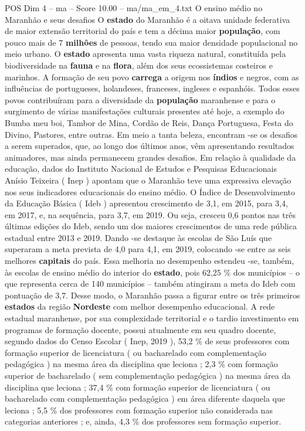 \begin{textsample}{POS Dim 4 – ma – Score 10.00 – ma/ma\_em\_4.txt}  \label{ex:f4_pos_060}
O ensino médio no Maranhão e seus desafios O \textbf{estado} do Maranhão é a oitava unidade federativa de maior extensão territorial do país e tem a décima maior \textbf{população}, com pouco mais de 7 \textbf{milhões} de pessoas, tendo sua maior densidade populacional no meio urbano.
O \textbf{estado} apresenta uma vasta riqueza natural, constituída pela biodiversidade na \textbf{fauna} e na \textbf{flora}, além dos seus ecossistemas costeiros e marinhos.
A formação de seu povo \textbf{carrega} a origem nos \textbf{índios} e negros, com as influências de portugueses, holandeses, franceses, ingleses e espanhóis.
Todos esses povos contribuíram para a diversidade da \textbf{população} maranhense e para o surgimento de várias manifestações culturais presentes até hoje, a exemplo do Bumba meu boi, Tambor de Mina, Cordão de Reis, Dança Portuguesa, Festa do Divino, Pastores, entre outras.
Em meio a tanta beleza, encontram -se os desafios a serem superados, que, ao longo dos últimos anos, vêm apresentando resultados animadores, mas ainda permanecem grandes desafios.
Em relação à qualidade da educação, dados do Instituto Nacional de Estudos e Pesquisas Educacionais Anísio Teixeira ( Inep ) apontam que o Maranhão teve uma expressiva elevação nos seus indicadores educacionais do ensino médio.
O Índice de Desenvolvimento da Educação Básica ( Ideb ) apresentou crescimento de 3,1, em 2015, para 3,4, em 2017, e, na sequência, para 3,7, em 2019.
Ou seja, cresceu 0,6 pontos nas três últimas edições do Ideb, sendo um dos maiores crescimentos de uma rede pública estadual entre 2013 e 2019.
Dando -se destaque às escolas de São Luís que superaram a meta prevista de 4,0 para 4,1, em 2019, colocando -se entre as seis melhores \textbf{capitais} do país.
Essa melhoria no desempenho estendeu -se, também, às escolas de ensino médio do interior do \textbf{estado}, pois 62,25 \% dos municípios – o que representa cerca de 140 municípios – também atingiram a meta do Ideb com pontuação de 3,7.
Desse modo, o Maranhão passa a figurar entre os três primeiros \textbf{estados} da região \textbf{Nordeste} com melhor desempenho educacional.
A rede estadual maranhense, por sua complexidade territorial e o tardio investimento em programas de formação docente, possui atualmente em seu quadro docente, segundo dados do Censo Escolar ( Inep, 2019 ), 53,2 \% de seus professores com formação superior de licenciatura ( ou bacharelado com complementação pedagógica ) na mesma área da disciplina que leciona ; 2,3 \% com formação superior de bacharelado ( sem complementação pedagógica ) na mesma área da disciplina que leciona ; 37,4 \% com formação superior de licenciatura ( ou bacharelado com complementação pedagógica ) em área diferente daquela que leciona ; 5,5 \% dos professores com formação superior não considerada nas categorias anteriores ; e, ainda, 4,3 \% dos professores sem formação superior.

\end{textsample}
